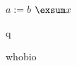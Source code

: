 \documentclass{article}
\begin{document}
     

\getx{}    \exget{} 

 $a := b$ $\exsum x$ 

\begin{rquote}q\end{rquote}
\begin{biop}{who}bio\end{biop}
\end{document}
